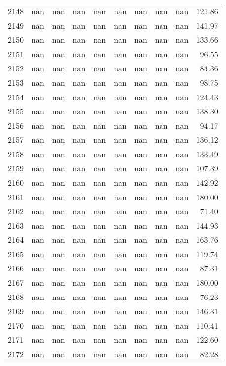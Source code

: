 \begin{tabular}{lrrrrrrrrr}
2148 & nan & nan & nan & nan & nan & nan & nan & nan & 121.86 \\
2149 & nan & nan & nan & nan & nan & nan & nan & nan & 141.97 \\
2150 & nan & nan & nan & nan & nan & nan & nan & nan & 133.66 \\
2151 & nan & nan & nan & nan & nan & nan & nan & nan & 96.55 \\
2152 & nan & nan & nan & nan & nan & nan & nan & nan & 84.36 \\
2153 & nan & nan & nan & nan & nan & nan & nan & nan & 98.75 \\
2154 & nan & nan & nan & nan & nan & nan & nan & nan & 124.43 \\
2155 & nan & nan & nan & nan & nan & nan & nan & nan & 138.30 \\
2156 & nan & nan & nan & nan & nan & nan & nan & nan & 94.17 \\
2157 & nan & nan & nan & nan & nan & nan & nan & nan & 136.12 \\
2158 & nan & nan & nan & nan & nan & nan & nan & nan & 133.49 \\
2159 & nan & nan & nan & nan & nan & nan & nan & nan & 107.39 \\
2160 & nan & nan & nan & nan & nan & nan & nan & nan & 142.92 \\
2161 & nan & nan & nan & nan & nan & nan & nan & nan & 180.00 \\
2162 & nan & nan & nan & nan & nan & nan & nan & nan & 71.40 \\
2163 & nan & nan & nan & nan & nan & nan & nan & nan & 144.93 \\
2164 & nan & nan & nan & nan & nan & nan & nan & nan & 163.76 \\
2165 & nan & nan & nan & nan & nan & nan & nan & nan & 119.74 \\
2166 & nan & nan & nan & nan & nan & nan & nan & nan & 87.31 \\
2167 & nan & nan & nan & nan & nan & nan & nan & nan & 180.00 \\
2168 & nan & nan & nan & nan & nan & nan & nan & nan & 76.23 \\
2169 & nan & nan & nan & nan & nan & nan & nan & nan & 146.31 \\
2170 & nan & nan & nan & nan & nan & nan & nan & nan & 110.41 \\
2171 & nan & nan & nan & nan & nan & nan & nan & nan & 122.60 \\
2172 & nan & nan & nan & nan & nan & nan & nan & nan & 82.28 \\

\end{tabular}
